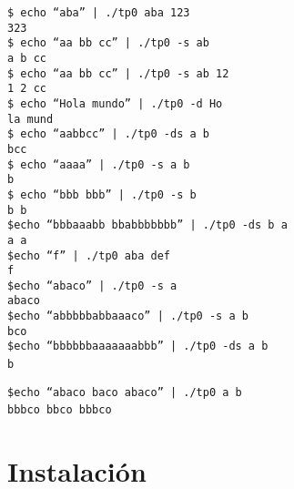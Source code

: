 \documentclass[a4paper,10pt]{article}
\begin{document}
\indent\texttt{\$ echo ``aba'' | ./tp0 aba 123}\\
\indent\texttt{323}\\

\indent\texttt{\$ echo ``aa bb cc'' | ./tp0 -s ab}\\
\indent\texttt{a b cc}\\

\indent\texttt{\$ echo ``aa bb cc'' | ./tp0 -s ab 12}\\
\indent\texttt{1 2 cc}\\

\indent\texttt{\$ echo ``Hola mundo'' | ./tp0 -d Ho}\\
\indent\texttt{la mund}\\

\indent\texttt{\$ echo ``aabbcc'' | ./tp0 -ds a b}\\
\indent\texttt{bcc}\\

\indent\texttt{\$ echo ``aaaa'' | ./tp0 -s a b}\\
\indent\texttt{b}\\

\indent\texttt{\$ echo ``bbb bbb'' | ./tp0 -s b}\\
\indent\texttt{b b}\\

\indent\texttt{\$echo ``bbbaaabb bbabbbbbbb'' | ./tp0 -ds b a}\\
\indent\texttt{a a}\\

\indent\texttt{\$echo ``f'' | ./tp0 aba def}\\
\indent\texttt{f}\\

\indent\texttt{\$echo ``abaco'' | ./tp0 -s a}\\
\indent\texttt{abaco}\\

\indent\texttt{\$echo ``abbbbbabbaaaco'' | ./tp0 -s a b}\\
\indent\texttt{bco}\\

\indent\texttt{\$echo ``bbbbbbaaaaaaabbb'' | ./tp0 -ds a b}\\
\indent\texttt{b}\

\indent\texttt{\$echo ``abaco baco abaco'' | ./tp0 a b}\\
\indent\texttt{bbbco bbco bbbco}\

\newpage
\newpage

\section{Instalaci\'{o}n}
\end{document}
